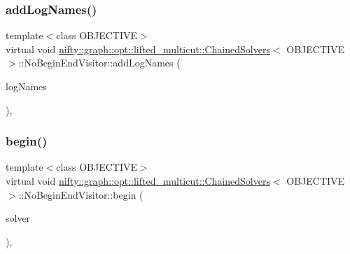 \subsubsection{\texorpdfstring{add\+Log\+Names()}{addLogNames()}}
{\footnotesize\ttfamily template$<$class O\+B\+J\+E\+C\+T\+I\+VE$>$ \\
virtual void \hyperlink{classnifty_1_1graph_1_1opt_1_1lifted__multicut_1_1ChainedSolvers}{nifty\+::graph\+::opt\+::lifted\+\_\+multicut\+::\+Chained\+Solvers}$<$ O\+B\+J\+E\+C\+T\+I\+VE $>$\+::No\+Begin\+End\+Visitor\+::add\+Log\+Names (\begin{DoxyParamCaption}\item[{std\+::initializer\+\_\+list$<$ std\+::string $>$}]{log\+Names }\end{DoxyParamCaption})\hspace{0.3cm}{\ttfamily [inline]}, {\ttfamily [virtual]}}

\mbox{\label{classnifty_1_1graph_1_1opt_1_1lifted__multicut_1_1ChainedSolvers_1_1NoBeginEndVisitor_a2f119eafaca61da6400964a9c2ad0a2b}} 
\subsubsection{\texorpdfstring{begin()}{begin()}}
{\footnotesize\ttfamily template$<$class O\+B\+J\+E\+C\+T\+I\+VE$>$ \\
virtual void \hyperlink{classnifty_1_1graph_1_1opt_1_1lifted__multicut_1_1ChainedSolvers}{nifty\+::graph\+::opt\+::lifted\+\_\+multicut\+::\+Chained\+Solvers}$<$ O\+B\+J\+E\+C\+T\+I\+VE $>$\+::No\+Begin\+End\+Visitor\+::begin (\begin{DoxyParamCaption}\item[{\hyperlink{classnifty_1_1graph_1_1opt_1_1lifted__multicut_1_1ChainedSolvers_a8d7bda129d1f1afb9dca81ff513dca09}{Base\+Type} $\ast$}]{solver }\end{DoxyParamCaption})\hspace{0.3cm}{\ttfamily [inline]}, {\ttfamily [virtual]}}


